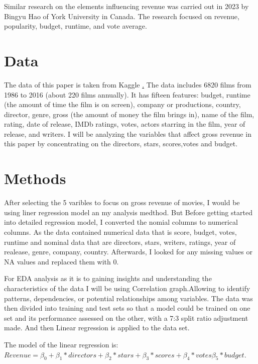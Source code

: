 \documentclass[12pt]{article}
\begin{document}
Similar research on the elements influencing revenue  was carried out in 2023 by Bingyu Hao 
of York University in Canada. The research focused on revenue, popularity, budget, runtime, and vote average.

\section{Data}
\label{sec:data}

The data of this paper is taken from Kaggle \href{https://www.kaggle.com/datasets/danielgrijalvas/movies}. 
The data includes 6820 films from 1986 to 2016 (about 220 films annually). It has
fifteen features: budget, runtime (the amount of time the film is on screen), company 
or productions, country, director, genre, gross (the amount of money the film brings in), 
name of the film, rating, date of release, IMDb ratings, votes, actors starring in the
film, year of release, and writers. I will be analyzing the variables that affect
gross revenue in this paper by concentrating on the directors, stars, scores,votes and budget.

\section{Methods}
\label{sec:meth}

After selecting the 5 varibles to focus on gross revenue of movies, I would be using
liner regression model an my analysis medthod. But Before getting started into detailed 
regression model, I converted the nomial columns to numerical columns. As the data contained 
numerical data that is score, budget, votes, runtime and nominal data that are directors, 
stars, writers, ratings, year of realease, genre, company, country. Afterwards, I looked for any missing values or NA values and replaced them with 0.

For EDA analysis as it is to gaining insights and understanding the characteristics of the data I will be using Correlation graph.Allowing to identify patterns, dependencies, or potential relationships among variables. The data was then divided into training and test sets so that a model could be trained on one set and its performance assessed on the other, with a 7:3 split ratio adjustment made. And then Linear regression is applied to the data set.


The model of the linear regression is:
$Revenue = \beta_0 +\beta_1*directors + \beta_2*stars + \beta_3*scores + \beta_4*votes \beta_5*budget$.
\end{document}
